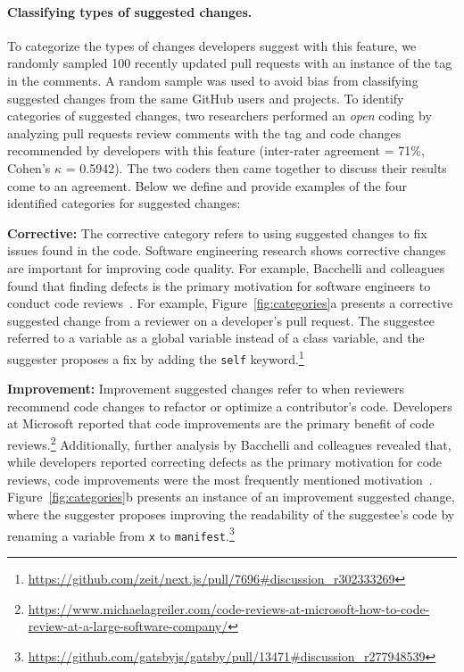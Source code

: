 \paragraph{Classifying types of suggested changes.}
To categorize the types of changes developers suggest with this feature, we randomly sampled 100 recently updated pull requests with an instance of the \sugg tag in the comments. A random sample was used to avoid bias from classifying suggested changes from the same GitHub users and projects. To identify categories of suggested changes, two researchers performed an \textit{open} coding by analyzing pull requests review comments with the \sugg tag and code changes recommended by developers with this feature (inter-rater agreement = 71\%, Cohen's $\kappa$ = 0.5942). The two coders then came together to discuss their results come to an agreement. Below we define and provide examples of the four identified categories for suggested changes:

\textbf{Corrective:} The corrective category refers to using suggested changes to fix issues found in the code. Software engineering research shows corrective changes are important for improving code quality. For example, Bacchelli and colleagues found that finding defects is the primary motivation for software engineers to conduct code reviews~\cite{bacchelli2013codereview}. For example, Figure~\ref{fig:categories}a presents a corrective suggested change from a reviewer on a developer's pull request. The suggestee referred to a variable as a global variable instead of a class variable, and the suggester proposes a fix by adding the \texttt{self} keyword.\footnote{\url{https://github.com/zeit/next.js/pull/7696#discussion_r302333269}}

\textbf{Improvement:} Improvement suggested changes refer to when reviewers recommend code changes to refactor or optimize a contributor's code. Developers at Microsoft reported that code improvements are the primary benefit of code reviews.\footnote{\url{https://www.michaelagreiler.com/code-reviews-at-microsoft-how-to-code-review-at-a-large-software-company/}} Additionally, further analysis by Bacchelli and colleagues revealed that, while developers reported correcting defects as the primary motivation for code reviews, code improvements were the most frequently mentioned motivation~\cite{bacchelli2013codereview}. Figure~\ref{fig:categories}b presents an instance of an improvement suggested change, where the suggester proposes improving the readability of the suggestee's code by renaming a variable from \texttt{x} to \texttt{manifest}.\footnote{\url{https://github.com/gatsbyjs/gatsby/pull/13471#discussion_r277948539}}

